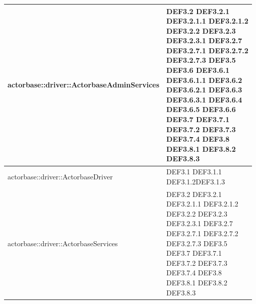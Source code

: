 \documentclass{scalatekids-article}
\begin{document}
\begin{longtable}[H]{|p{12cm}|p{5.5cm}|}
  \hline
  actorbase::driver::ActorbaseAdminServices & \multiLineCell[t]{DEF3.2 DEF3.2.1\\DEF3.2.1.1 DEF3.2.1.2\\DEF3.2.2 DEF3.2.3\\DEF3.2.3.1 DEF3.2.7\\DEF3.2.7.1 DEF3.2.7.2\\DEF3.2.7.3 DEF3.5\\DEF3.6 DEF3.6.1\\DEF3.6.1.1 DEF3.6.2\\DEF3.6.2.1 DEF3.6.3\\DEF3.6.3.1 DEF3.6.4\\DEF3.6.5 DEF3.6.6\\DEF3.7 DEF3.7.1\\DEF3.7.2 DEF3.7.3\\DEF3.7.4 DEF3.8\\DEF3.8.1 DEF3.8.2\\DEF3.8.3}\\
  \hline
  actorbase::driver::ActorbaseDriver & \multiLineCell[t]{DEF3.1 DEF3.1.1\\DEF3.1.2DEF3.1.3\\}\\
  \hline
  actorbase::driver::ActorbaseServices & \multiLineCell[t]{DEF3.2 DEF3.2.1\\DEF3.2.1.1 DEF3.2.1.2\\DEF3.2.2 DEF3.2.3\\DEF3.2.3.1 DEF3.2.7\\DEF3.2.7.1 DEF3.2.7.2\\DEF3.2.7.3 DEF3.5\\DEF3.7 DEF3.7.1\\DEF3.7.2 DEF3.7.3\\DEF3.7.4 DEF3.8\\DEF3.8.1 DEF3.8.2\\DEF3.8.3}\\
  \hline

\end{longtable}
\end{document}
